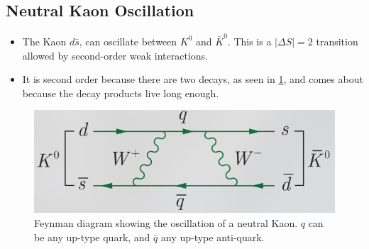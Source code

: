 \subsection{Neutral Kaon Oscillation}
\begin{itemize}
  \item The Kaon $d \bar{s}$, can oscillate between $K^{0}$ and $\bar{K}^{0}$. This is a $\left|ΔS\right| = 2$ transition allowed by second-order weak interactions. 
  \item It is second order because there are two decays, as seen in \cref{fig: kaon_oscillation}, and comes about because the decay products live long enough. 
\end{itemize}
\begin{figure}[h!]
\centering
\includegraphics[width = \textwidth]{kaon_oscillation.png}
\caption{Feynman diagram showing the oscillation of a neutral Kaon. $q$ can be any up-type quark, and $\bar{q}$ any up-type anti-quark.}
\label{fig: kaon_oscillation}
\end{figure}


